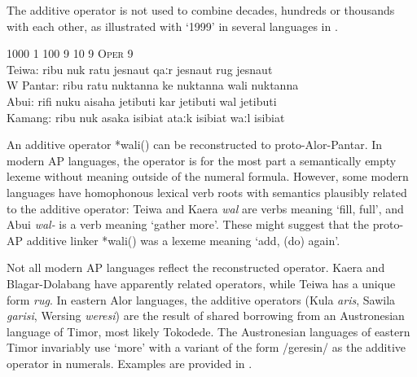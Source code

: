 The additive operator is not used to combine decades, hundreds or thousands with each other, as illustrated with `1999' in several languages in . 




\let\eachwordone=\rm
\let\eachwordtwo=\it
\let\eachwordthree=\it
\let\eachwordfour=\it
\let\eachwordfive=\it 

\ea%
\label{ex:6:15} 
\glllll  {}     1000  1  100  9  10  9  \textsc{Oper}  9\\
  {\rm Teiwa:}  ribu   nuk  ratu  jesna{\textglotstop}ut  qaːr  jesna{\textglotstop}ut  rug  jesna{\textglotstop}ut\\
  {\rm W Pantar:} ribu {}   ratu  nuktanna{\ng}  ke nuktanna{\ng} wali  nuktanna{\ng}\\
  {\rm Abui:}  	rifi   nuku  aisaha  jeti{\ng}buti  kar  jeti{\ng}buti  wal  jeti{\ng}buti\\
  {\rm Kamang:}	ribu   nuk  asaka  isi{\ng}biat  ataːk  isi{\ng}biat  waːl  isi{\ng}biat\\
\z


\let\eachwordone=\it
\let\eachwordtwo=\rm
\let\eachwordthree=\rm
\let\eachwordfour=\rm
\let\eachwordfive=\rm 

An additive operator *wali({\ng}) can be reconstructed to proto-Alor-Pantar. In modern AP languages, the operator is for the most part a semantically empty lexeme without meaning outside of the numeral formula. However, some modern languages have homophonous lexical verb roots with semantics plausibly related to the additive operator: Teiwa and Kaera \textit{wal} are verbs meaning `fill, full', and Abui \textit{wal-} is a verb meaning `gather more'. These might suggest that the proto-AP additive linker *wali({\ng}) was a lexeme meaning `add, (do) again'. 

Not all modern AP languages reflect the reconstructed operator. Kaera and Blagar-Dolabang have apparently related operators, while Teiwa has a unique form \textit{rug}. In eastern Alor languages, the additive operators (Kula \textit{aris}\textit{{\textbari}}\textit{{\ng}}, Sawila \textit{garisi{\ng}}, Wersing \textit{weresi{\ng}}) are the result of shared borrowing from an Austronesian  language of Timor, most likely Tokodede. The Austronesian languages of eastern Timor invariably use  `more' with a variant of the form /geresin/ as the additive operator in numerals. Examples are provided in .   




